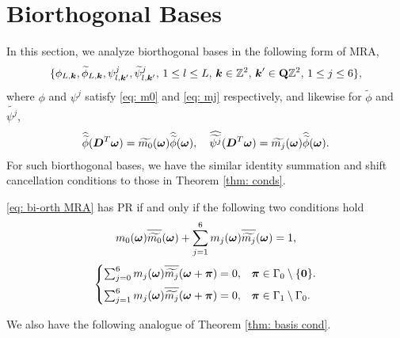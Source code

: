 \section{Biorthogonal Bases}\label{sec: bi-orth}
In this section, we analyze biorthogonal bases in the following form of MRA,
\begin{align}\label{eq: bi-orth MRA}
\{\phi_{L,\boldsymbol{k}},\widetilde{\phi}_{L,\boldsymbol{k}}, \psi_{l,\boldsymbol{k}'}^j,\widetilde{\psi}_{l,\boldsymbol{k}'}^j,\, 1\leq l\leq L,\,\boldsymbol{k}\in\mathbb{Z}^2,\, \boldsymbol{k}'\in\mathbf{Q}\mathbb{Z}^2,\,1\leq j\leq 6 \},
\end{align}
where $\phi$ and $\psi^j$ satisfy \eqref{eq: m0} and \eqref{eq: mj} respectively, and likewise for $\widetilde{\phi}$ and $\widetilde{\psi^j}$,
\begin{align}\label{eq: mj_dual}
\widehat{\widetilde{\phi}}(\boldsymbol{D}^T\boldsymbol{\omega}) = \widetilde{m_0}(\boldsymbol{\omega})\widehat{\widetilde{\phi}}(\boldsymbol{\omega}),\quad \widehat{\widetilde{\psi^j}}(\boldsymbol{D}^T\boldsymbol{\omega}) = \widetilde{m_j}(\boldsymbol{\omega})\widehat{\widetilde{\phi}}(\boldsymbol{\omega}).
\end{align}
For such biorthogonal bases, we have the similar identity summation and shift cancellation conditions to those in Theorem \ref{thm: conds}.
\begin{thm}\label{thm: bi-orth conds}
\eqref{eq: bi-orth MRA} has PR if and only if the following two conditions hold
\begin{align}\label{eq: id-sum 2}
m_0(\boldsymbol{\omega})\sbarm{0} + \sum_{j = 1}^6 m_j(\boldsymbol{\omega})\sbarm{j} = 1,
\end{align}
\begin{equation}\label{eq: shift-cancel 2}
\begin{cases}
\sum_{j = 0}^6m_j(\boldsymbol{\omega})\overlinespace{\widetilde{m_j}}(\boldsymbol{\omega} + \boldsymbol{\pi}) = 0, & \boldsymbol{\pi}\in \Gamma_0\setminus\{\boldsymbol{0}\}.\\[.5em]
\sum_{j=1}^6m_j(\boldsymbol{\omega})\overlinespace{\widetilde{m_j}}(\boldsymbol{\omega}+\boldsymbol{\pi}) = 0, & \boldsymbol{\pi}\in\Gamma_1\setminus\Gamma_0.
\end{cases}
\end{equation}
\end{thm}
\vspace{1em}
We also have the following analogue of Theorem \ref{thm: basis cond}.
